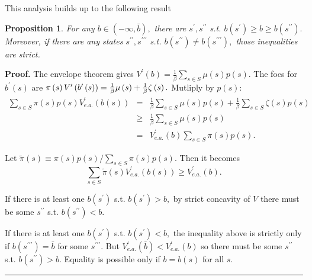 \documentclass{article}
\newtheorem{proposition}[theorem]{Proposition}
\newenvironment{proof}[1][Proof]{\noindent\textbf{#1.} }{\ \rule{0.5em}{0.5em}}
\begin{document}
\smallskip

This analysis builds up to the following result

\begin{proposition}
\label{prop: b(s) relative to b}For any $b\in (-\infty ,\bar{b}),$ there are 
$s^{\prime },s^{\prime \prime }$ s.t. $b\left( s^{\prime }\right) \geq b\geq
b\left( s^{\prime \prime }\right) .$ Moreover, if there are any states $%
s^{\prime \prime },s^{\prime \prime \prime }$ s.t. $b\left( s^{\prime \prime
}\right) \neq b\left( s^{\prime \prime \prime }\right) ,$ those inequalities
are strict.
\end{proposition}

\begin{proof}
The envelope theorem gives $V^{\prime }\left( b\right) =\frac{1}{\beta }%
\sum_{s\in S}\mu \left( s\right) p\left( s\right) .$ The focs for $b^{\prime
}\left( s\right) $ are $\pi \left( s\right) V^{\prime }\left( b^{\prime
}\left( s\right) \right) =\frac{1}{\beta }\mu \left( s\right) +\frac{1}{%
\beta }\zeta \left( s\right) .$ Mutliply by $p\left( s\right) :$%
\begin{eqnarray*}
\sum_{s\in S}\pi \left( s\right) p\left( s\right) V_{e.a.}^{\prime }\left(
b\left( s\right) \right) &=&\frac{1}{\beta }\sum_{s\in S}\mu \left( s\right)
p\left( s\right) +\frac{1}{\beta }\sum_{s\in S}\zeta \left( s\right) p\left(
s\right) \\
&\geq &\frac{1}{\beta }\sum_{s\in S}\mu \left( s\right) p\left( s\right) \\
&=&V_{e.a.}^{\prime }\left( b\right) \sum_{s\in S}\pi \left( s\right)
p\left( s\right) .
\end{eqnarray*}

Let $\tilde{\pi}\left( s\right) \equiv \pi \left( s\right) p\left( s\right)
/\sum_{s\in S}\pi \left( s\right) p\left( s\right) .$ Then it becomes 
\[
\sum_{s\in S}\tilde{\pi}\left( s\right) V_{e.a.}^{\prime }\left( b\left(
s\right) \right) \geq V_{e.a.}^{\prime }\left( b\right) . 
\]

If there is at least one $b\left( s^{\prime }\right) $ s.t. $b\left(
s^{\prime }\right) >b,$ by strict concavity of $V$ there must be some $%
s^{\prime \prime }$ s.t. $b\left( s^{\prime \prime }\right) <b.$

If there is at least one $b\left( s^{\prime }\right) $ s.t. $b\left(
s^{\prime }\right) <b,$ the inequality above is strictly only if $b\left(
s^{\prime \prime \prime }\right) =\bar{b}$ for some $s^{\prime \prime \prime
}.$ But $V_{e.a.}^{\prime }\left( \bar{b}\right) <V_{e.a.}^{\prime }\left(
b\right) $ so there must be some $s^{\prime \prime }$ s.t. $b\left(
s^{\prime \prime }\right) >b.$ Equality is possible only if $b=b\left(
s\right) $ for all $s.$
\end{proof}
\end{document}
